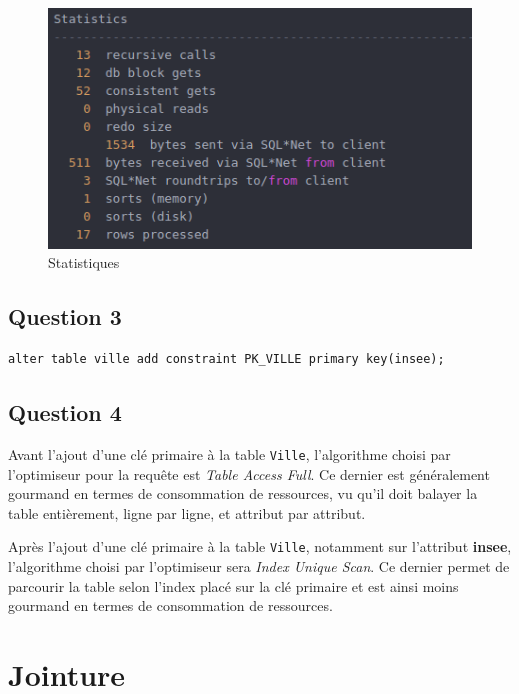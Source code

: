 \documentclass[a4paper,12pt]{article}
\begin{document}
\begin{figure}[!ht]
  \centering
  \includegraphics[scale=0.6]{images/q2_2.png}
  \caption{Statistiques}
\end{figure}

\newpage

\subsection{Question 3}
\begin{minipage}{\linewidth}
  \begin{lstlisting}[caption={ajout d'une clé primaire sur la table Ville en utilisant l'attribut insee}]
    alter table ville add constraint PK_VILLE primary key(insee);
  \end{lstlisting}
\end{minipage}

\subsection{Question 4}
Avant l'ajout d'une clé primaire à la table \texttt{Ville}, l'algorithme choisi par l'optimiseur pour la requête est \textit{Table Access Full}. Ce dernier est généralement gourmand en termes de consommation de ressources, vu qu'il doit balayer la table entièrement, ligne par ligne, et attribut par attribut.

Après l'ajout d'une clé primaire à la table \texttt{Ville}, notamment sur l'attribut \textbf{insee}, l'algorithme choisi par l'optimiseur sera \textit{Index Unique Scan}. Ce dernier permet de parcourir la table selon l'index placé sur la clé primaire et est ainsi moins gourmand en termes de consommation de ressources.

\section{Jointure}
\end{document}
